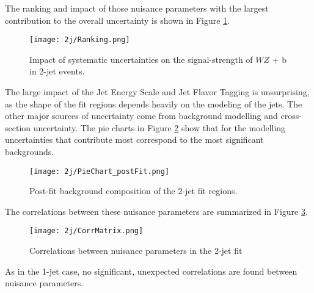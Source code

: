 The ranking and impact of those nuisance parameters with the largest contribution to the overall uncertainty is shown in Figure \ref{fig:ranking_2j}.

\begin{figure}[H]
    \centering
    \texttt{[image: 2j/Ranking.png]}
    \caption{Impact of systematic uncertainties on the signal-strength of $WZ$ + b in 2-jet events.}
    \label{fig:ranking_2j}
\end{figure}

The large impact of the Jet Energy Scale and Jet Flavor Tagging is unsurprising, as the shape of the fit regions depends heavily on the modeling of the jets. The other major sources of uncertainty come from background modelling and cross-section uncertainty. The pie charts in Figure \ref{fig:pie_chart_2j} show that for the modelling uncertainties that contribute most correspond to the most significant backgrounds. %

\begin{figure}[H]
    \centering
    \texttt{[image: 2j/PieChart\_postFit.png]}
    \caption{Post-fit background composition of the 2-jet fit regions.}
    \label{fig:pie_chart_2j}
\end{figure}

The correlations between these nuisance parameters are summarized in Figure \ref{fig:corr_mat_2j}. 

\begin{figure}[H]
    \centering
    \texttt{[image: 2j/CorrMatrix.png]}
    \caption{Correlations between nuisance parameters in the 2-jet fit}
    \label{fig:corr_mat_2j}
\end{figure}

As in the 1-jet case, no significant, unexpected correlations are found between nuisance parameters.



